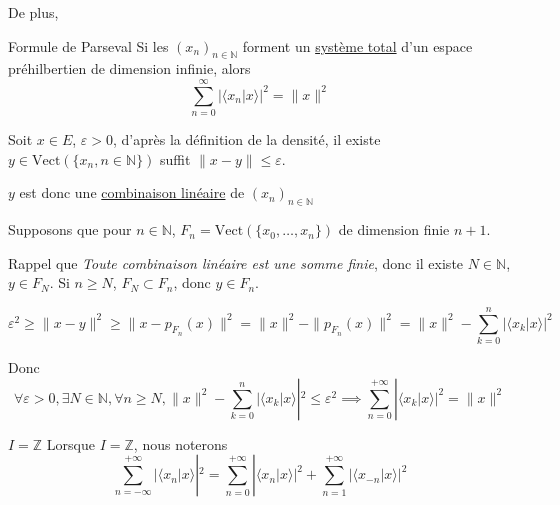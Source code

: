 De plus, 

\begin{Theorem}{Formule de Parseval}{}
Si les $(x_n) _{n \in \mathbb{N}}$ forment un \underline{système total} d'un espace préhilbertien de dimension infinie, alors 
\[
  \sum_{n=0}^{  \infty} | \langle x_n | x \rangle | ^{2 } = \| x \| ^{2}
\]
\end{Theorem}

\begin{myproof}{}{}
  Soit $x \in E$, $\varepsilon >0$, d'après la définition de la densité, il existe $y \in \mathrm{Vect}(\{ x_n, n\in \mathbb{N}\})$ suffit $\| x-y  \| \le \varepsilon$. 


  $y$ est donc une \underline{combinaison linéaire} de $(x_n) _{n\in \mathbb{N}}$ 

  Supposons que pour $n \in \mathbb{N}$, $F_n= \mathrm{Vect} \left( \{x_0, \dots, x_n\} \right)$ de dimension finie $n+1$.

  Rappel que \textit{Toute combinaison linéaire est une somme finie}, donc il existe $N \in \mathbb{N}$, $y \in F_N$. Si $n \ge N$, $F_N \subset F_n$, donc $y \in F_n$. 

  \[
    \varepsilon ^{2 } \ge \| x - y  \| ^{2 } \ge \|  x - p _{F_n }(x)  \| ^{2 } = \| x  \| ^{2 } - \| p _{F_n }(x)  \|^{2} = \| x  \| ^{2 } - \sum_{k=0 }^{ n } |\langle x_k | x  \rangle| ^{2}
  \]

  Donc 
  \[
      \forall \varepsilon >0, \exists N \in \mathbb{N}, \forall n \ge N, \|  x  \| ^{2 }- \sum_{k=0 }^{ n } |\langle x_k | x  \rangle| ^{2 } \le \varepsilon ^{2 } \implies \sum_{n=0 }^{ + \infty } | \langle x_k | x  \rangle | ^{2 } = \|  x  \| ^{2}
  \]
\end{myproof}

\begin{Example}{$I = \mathbb{Z}$}{}
Lorsque $I = \mathbb{Z}$, nous noterons 
\[
  \sum_{n= - \infty }^{ + \infty } | \langle x_n | x  \rangle| ^{2 } = \sum_{n=0 }^{ + \infty } | \langle x_n | x \rangle | ^{2 } + \sum_{n=1 }^{ + \infty } | \langle x _{-n }| x  \rangle| ^{2}
\]
\end{Example}

